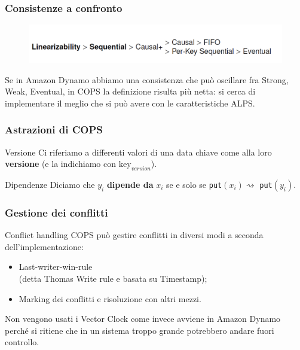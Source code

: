\begin{frame}
\frametitle{Consistenze a confronto}
	\begin{figure}
		\centering
		\includegraphics[scale=0.35]{COPS/COPS6.png}
	\end{figure}

Se in Amazon Dynamo abbiamo una consistenza che può oscillare fra Strong, Weak, Eventual,
in COPS la definizione risulta più netta: si cerca di implementare il meglio che si può
avere con le caratteristiche ALPS.
\end{frame}

\begin{frame}
\frametitle{Astrazioni di COPS}
\begin{block}{Versione}
Ci riferiamo a differenti valori di una data chiave come alla loro \textbf{versione}
(e la indichiamo con $\text{key}_{version}$).
\end{block}
\begin{block}{Dipendenze}
Diciamo che $y_i$ \textbf{dipende da} $x_i$ se e solo se \texttt{put}$(x_i)
\rightsquigarrow$ \texttt{put}$(y_i)$.
\end{block}
\end{frame}

\begin{frame}
\frametitle{Gestione dei conflitti}
\begin{block}{Conflict handling}
COPS può gestire conflitti in diversi modi a seconda dell'implementazione:
	\begin{itemize}
		\item<1-> Last-writer-win-rule \\
				  (detta Thomas Write rule e basata su Timestamp);
		\item<2-> Marking dei conflitti e risoluzione con altri mezzi.
	\end{itemize}
\end{block}
Non vengono usati i Vector Clock come invece avviene in Amazon Dynamo perché
si ritiene che in un sistema troppo grande potrebbero andare fuori controllo.
\end{frame}

